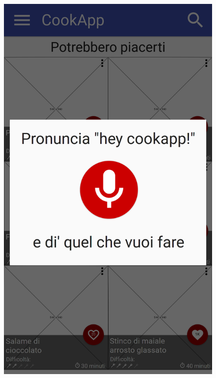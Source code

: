 \begin{figure}[H]
\begin{minipage}{.49\textwidth}
		\includegraphics[width=\textwidth]{img/wireframe/homepage_start_audio.png}
	\end{minipage}
\end{figure}
